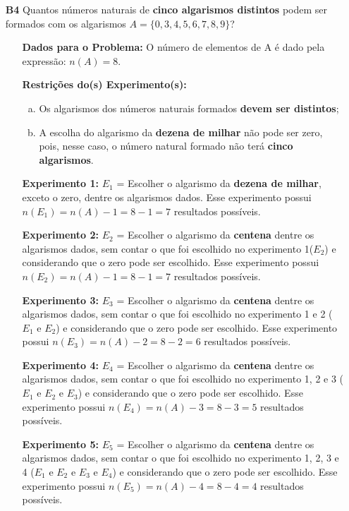 \documentclass[a4paper,12pt]{article}
\begin{document}
\begin{enumerate}
\item[\textbf{B4}] Quantos números naturais de \textbf{cinco algarismos distintos} podem ser formados com os algarismos $A = \{0, 3, 4, 5, 6, 7, 8, 9\}$?
 \begin{itemize}
     \item[\ding{172}] \textbf{Dados para o Problema:} O número de elementos de A é dado pela expressão: $n(A)= 8$.
     \item[\ding{173}] \textbf{Restrições do(s) Experimento(s):}
        \begin{enumerate}[a)]
          \item Os algarismos dos números naturais formados \textbf{devem ser distintos};
          \item A escolha do algarismo da \textbf{dezena de milhar} não pode ser zero, pois, nesse caso, o número natural formado não terá \textbf{cinco algarismos}.
        \end{enumerate}
     \item[\ding{174}] \textbf{Experimento 1:} $E_1$ = Escolher o algarismo da \textbf{dezena de milhar}, exceto o zero, dentre os algarismos dados. Esse experimento possui $n(E_1) = n(A) - 1 = 8 - 1 = 7$ resultados possíveis.
     \item[\ding{175}] \textbf{Experimento 2:} $E_2$ = Escolher o algarismo da \textbf{centena} dentre os algarismos dados, sem contar o que foi escolhido no experimento 1($E_2$) e considerando que o zero pode ser escolhido. Esse experimento possui $n(E_2) = n(A) - 1 = 8 - 1 = 7$ resultados possíveis.
     \item[\ding{175}] \textbf{Experimento 3:} $E_3$ = Escolher o algarismo da \textbf{centena} dentre os algarismos dados, sem contar o que foi escolhido no experimento 1 e 2 ($E_1 \textrm{ e } E_2$) e considerando que o zero pode ser escolhido. Esse experimento possui $n(E_3) = n(A) - 2 = 8 - 2 = 6$ resultados possíveis.     
     \item[\ding{175}] \textbf{Experimento 4:} $E_4$ = Escolher o algarismo da \textbf{centena} dentre os algarismos dados, sem contar o que foi escolhido no experimento 1, 2 e 3 ($E_1 \textrm{ e } E_2 \textrm{ e } E_3$) e considerando que o zero pode ser escolhido. Esse experimento possui $n(E_4) = n(A) - 3 = 8 - 3 = 5$ resultados possíveis.
     \item[\ding{175}] \textbf{Experimento 5:} $E_5$ = Escolher o algarismo da \textbf{centena} dentre os algarismos dados, sem contar o que foi escolhido no experimento 1, 2, 3 e 4 ($E_1 \textrm{ e } E_2 \textrm{ e } E_3 \textrm{ e } E_4$) e considerando que o zero pode ser escolhido. Esse experimento possui $n(E_5) = n(A) - 4 = 8 - 4 = 4$ resultados possíveis.       

\end{itemize}
\end{enumerate}
\end{document}
